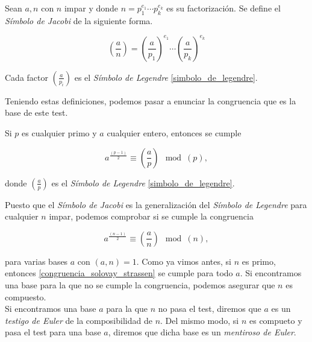 \begin{definicion}\label{simbolo_de_jacobi}
	Sean $a, n$ con $n$ impar y donde $n = p_1^{e_1}\dotsb p_k^{e_k}$ es su factorización. Se define el \textit{Símbolo de Jacobi} de la siguiente forma.
	
	\begin{equation}
	\left(\frac{a}{n}\right) = \left(\frac{a}{p_1}\right)^{e_1}\dotsb\left(\frac{a}{p_k}\right)^{e_k}
	\end{equation}
	
	Cada factor $\left(\frac{a}{p_i}\right)$ es el \textit{Símbolo de Legendre} \ref{simbolo_de_legendre}.
\end{definicion}

Teniendo estas definiciones, podemos pasar a enunciar la congruencia que es la base de este test.

\begin{proposicion}
	Si $p$ es cualquier primo y $a$ cualquier entero, entonces se cumple
	
	\begin{equation}
	a^{\frac{(p-1)}{2}} \equiv \left(\frac{a}{p}\right) \mod(p),
	\end{equation}
	
	donde $\left(\frac{a}{p}\right)$ es el \textit{Símbolo de Legendre} \ref{simbolo_de_legendre}.
\end{proposicion}

Puesto que el \textit{Símbolo de Jacobi} es la generalización del \textit{Símbolo de Legendre} para cualquier $n$ impar, podemos comprobar si se cumple la congruencia

\begin{equation}\label{congruencia_solovay_strassen}
a^{\frac{(n-1)}{2}} \equiv \left(\frac{a}{n}\right) \mod(n),
\end{equation}

para varias bases $a$ con $(a, n) = 1$. Como ya vimos antes, si $n$ es primo, entonces \eqref{congruencia_solovay_strassen} se cumple para todo $a$. Si encontramos una base para la que no se cumple la congruencia, podemos asegurar que $n$ es compuesto.\\

Si encontramos una base $a$ para la que $n$ no pasa el test, diremos que $a$ es un \textit{testigo de Euler} de la composibilidad de $n$. Del mismo modo, si $n$ es compueto y pasa el test para una base $a$, diremos que dicha base es un \textit{mentiroso de Euler}.\\

